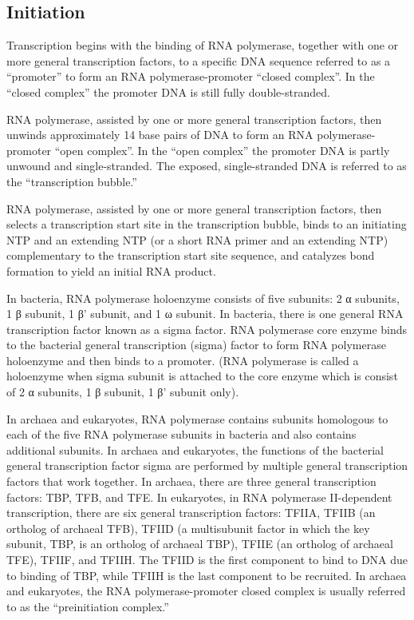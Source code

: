 \hypertarget{initiation-1}{%
\subsection{Initiation}\label{initiation-1}}

Transcription begins with the binding of RNA polymerase, together with one or more general transcription factors, to a specific DNA sequence referred to as a ``promoter'' to form an RNA polymerase-promoter ``closed complex''. In the ``closed complex'' the promoter DNA is still fully double-stranded.

RNA polymerase, assisted by one or more general transcription factors, then unwinds approximately 14 base pairs of DNA to form an RNA polymerase-promoter ``open complex''. In the ``open complex'' the promoter DNA is partly unwound and single-stranded. The exposed, single-stranded DNA is referred to as the ``transcription bubble.''

RNA polymerase, assisted by one or more general transcription factors, then selects a transcription start site in the transcription bubble, binds to an initiating NTP and an extending NTP (or a short RNA primer and an extending NTP) complementary to the transcription start site sequence, and catalyzes bond formation to yield an initial RNA product.

In bacteria, RNA polymerase holoenzyme consists of five subunits: 2 α subunits, 1 β subunit, 1 β' subunit, and 1 ω subunit. In bacteria, there is one general RNA transcription factor known as a sigma factor. RNA polymerase core enzyme binds to the bacterial general transcription (sigma) factor to form RNA polymerase holoenzyme and then binds to a promoter. (RNA polymerase is called a holoenzyme when sigma subunit is attached to the core enzyme which is consist of 2 α subunits, 1 β subunit, 1 β' subunit only).

In archaea and eukaryotes, RNA polymerase contains subunits homologous to each of the five RNA polymerase subunits in bacteria and also contains additional subunits. In archaea and eukaryotes, the functions of the bacterial general transcription factor sigma are performed by multiple general transcription factors that work together. In archaea, there are three general transcription factors: TBP, TFB, and TFE. In eukaryotes, in RNA polymerase II-dependent transcription, there are six general transcription factors: TFIIA, TFIIB (an ortholog of archaeal TFB), TFIID (a multisubunit factor in which the key subunit, TBP, is an ortholog of archaeal TBP), TFIIE (an ortholog of archaeal TFE), TFIIF, and TFIIH. The TFIID is the first component to bind to DNA due to binding of TBP, while TFIIH is the last component to be recruited. In archaea and eukaryotes, the RNA polymerase-promoter closed complex is usually referred to as the ``preinitiation complex.''

